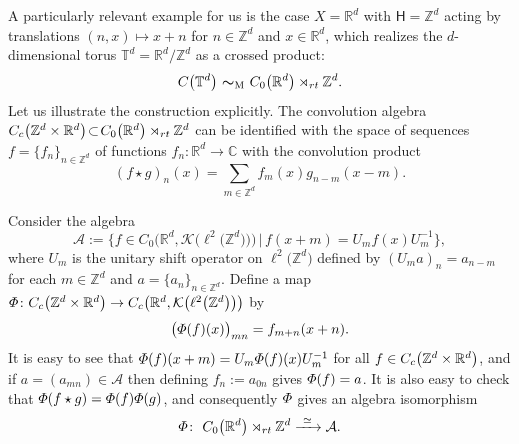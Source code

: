 \documentclass[11pt]{article}
\numberwithin{equation}{section}
\numberwithin{equation}{section}
\newcommand{\Z}{\zed}
\newcommand{\mbf}[1]{{\boldsymbol {#1} }}
\newcommand{\CK}{\mathcal{K}}
\newcommand{\sfH}{\mathsf{H}}
\newcommand{\rt}{{\rm rt}}
\newcommand{\R}{\real}
\newcommand{\complex}{{\mathbb C}} %
\newcommand{\zed}{{\mathbb Z}} %
\newcommand{\real}{{\mathbb R}} %
\newcommand{\torus}{{\mathbb T}} %
\def\alg{{\mathcal A}}
\begin{document}
\begin{Example}[tori]\label{ex:Moritatori}
A particularly relevant example for us is the case $X=\real^d$ with
$\sfH=\zed^d$ acting by translations $(n,x)\mapsto x+n$ for
$n\in\zed^d$ and $x\in\real^d$, which realizes the
$d$-dimensional torus $\torus^d=\real^d/\zed^d$ as a crossed product:
\[
C\big(\torus^d\big) \ \mbf\sim_{\text{\tiny M}} \ C_0\big(\real^d\big)\rtimes_\rt \zed^d .
\]
Let us illustrate the construction explicitly. The convolution algebra
$C_{\rm c}\big(\Z^d\times\real^d\big)\!\subset\! C_0\big(\R^d\big)\rtimes_\rt\Z^d$ can be
identified with the space of sequences $f=\{f_n\}_{n\in\Z^d}$ of
functions $f_n\colon \real^d\to\complex$ with the convolution product
\[
(f\star g)_n(x) = \sum_{m\in\Z^d} f_m(x) g_{n-m}(x-m) .
\]

Consider the algebra
\[
\alg:=\big\{f\in C_0\big(\real^d,\CK\big(\ell^2\big(\zed^d\big)\big)\big) \, \big| \, f(x+m)
= U_m f(x) U_{m}^{-1}\big\} ,
\]
where $U_m$ is the unitary shift operator on $\ell^2\big(\zed^d\big)$ defined by
$(U_ma)_n=a_{n-m}$ for each $m\in\Z^d$ and $a=\{a_n\}_{n\in\Z^d}$.
Define a map ${\mit\Phi}\colon C_{\rm c}\big(\Z^d\times\real^d\big)\to
C_{\rm c}\big(\real^d,\CK\big(\ell^2\big(\Z^d\big)\big)\big)$ by
\[
\big({\mit\Phi}(f)(x)\big)_{mn} = f_{m+n}(x+n) .
\]
It is easy to see that ${\mit\Phi}(f)(x+m) =
U_m {\mit\Phi}(f)(x) U_m^{-1}$ for all $f\in C_{\rm
 c}\big(\zed^d\times\real^d\big)$, and if $a=(a_{mn})\in\alg$ then defining
$f_n:=a_{0n}$ gives ${\mit\Phi}(f)=a$. It is also easy to check that
${\mit\Phi}(f\star g) = {\mit\Phi}(f) {\mit\Phi}(g)$, and consequently
$\mit\Phi$ gives an algebra isomorphism
\[
{\mit\Phi}\colon \ C_0\big(\real^d\big)\rtimes_\rt\zed^d \xrightarrow{ \ \simeq \ } \alg .
\]


\end{Example}
\end{document}
